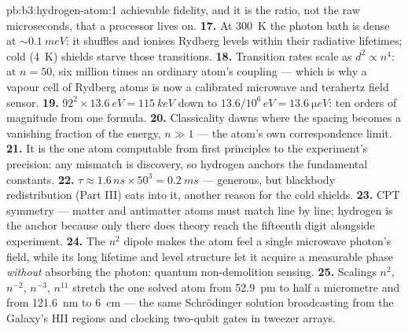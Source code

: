 \begin{solution}{pb:b3:hydrogen-atom:1}
achievable fidelity, and it is the ratio, not the raw
microseconds, that a processor lives on.
\textbf{17.} At \qty{300}{K} the photon bath is dense at
$\sim\qty{0.1}{meV}$: it shuffles and ionises Rydberg levels within
their radiative lifetimes; cold (\qty{4}{K}) shields starve those
transitions.
\textbf{18.} Transition rates scale as $d^2 \propto n^4$: at $n =
50$, six million times an ordinary atom's coupling --- which is why
a vapour cell of Rydberg atoms is now a calibrated microwave and
terahertz field sensor.
\textbf{19.} $92^2 \times \qty{13.6}{eV} = \qty{115}{keV}$ down to
$13.6/10^6\,\unit{eV} = \qty{13.6}{\micro eV}$: ten orders of
magnitude from one formula.
\textbf{20.} Classicality dawns where the spacing becomes a
vanishing fraction of the energy, $n \gg 1$ --- the atom's own
correspondence limit.
\textbf{21.} It is the one atom computable from first principles
to the experiment's precision: any mismatch is discovery, so
hydrogen anchors the fundamental constants.
\textbf{22.} $\tau \approx 1.6\,\unit{ns} \times 50^3 =
\qty{0.2}{ms}$ --- generous, but blackbody redistribution (Part
III) eats into it, another reason for the cold shields.
\textbf{23.} CPT symmetry --- matter and antimatter atoms must
match line by line; hydrogen is the anchor because only there does
theory reach the fifteenth digit alongside experiment.
\textbf{24.} The $n^2$ dipole makes the atom feel a single
microwave photon's field, while its long lifetime and level
structure let it acquire a measurable phase \emph{without}
absorbing the photon: quantum non-demolition sensing.
\textbf{25.} Scalings $n^2$, $n^{-2}$, $n^{-3}$, $n^{11}$ stretch
the one solved atom from \qty{52.9}{pm} to half a micrometre and
from \qty{121.6}{nm} to \qty{6}{cm} --- the same Schrödinger
solution broadcasting from the Galaxy's HII regions and clocking
two-qubit gates in tweezer arrays.
\end{solution}
